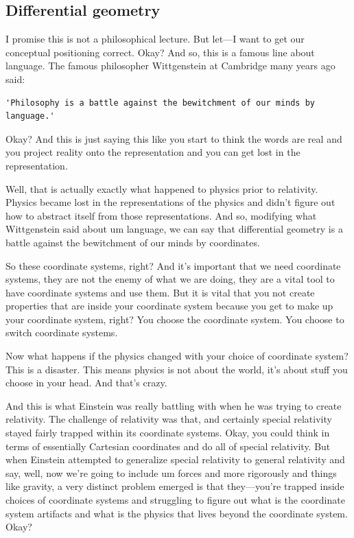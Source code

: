 \subsection{Differential geometry}
I promise this is not a philosophical lecture. But let—I want to get our conceptual positioning correct. Okay? And so, this is a famous line about language. The famous philosopher Wittgenstein at Cambridge many years ago said: 

\begin{centering}
\begin{verbatim}
'Philosophy is a battle against the bewitchment of our minds by language.' 
\end{verbatim}
\end{centering}
Okay? And this is just saying this like you start to think the words are real and you project reality onto the representation and you can get lost in the representation. 

Well, that is actually exactly what happened to physics prior to relativity. Physics became lost in the representations of the physics and didn't figure out how to abstract itself from those representations. And so, modifying what Wittgenstein said about um language, we can say that differential geometry is a battle against the bewitchment of our minds by coordinates. 

So these coordinate systems, right? And it's important that we need coordinate systems, they are not the enemy of what we are doing, they are a vital tool to have coordinate systems and use them. But it is vital that you not create properties that are inside your coordinate system because you get to make up your coordinate system, right? You choose the coordinate system. You choose to switch coordinate systems. 

Now what happens if the physics changed with your choice of coordinate system? This is a disaster. This means physics is not about the world, it's about stuff you choose in your head. And that's crazy. 

And this is what Einstein was really battling with when he was trying to create relativity. The challenge of relativity was that, and certainly special relativity stayed fairly trapped within its coordinate systems. Okay, you could think in terms of essentially Cartesian coordinates and do all of special relativity. But when Einstein attempted to generalize special relativity to general relativity and say, well, now we're going to include um forces and more rigorously and things like gravity, a very distinct problem emerged is that they—you're trapped inside choices of coordinate systems and struggling to figure out what is the coordinate system artifacts and what is the physics that lives beyond the coordinate system. Okay? 

